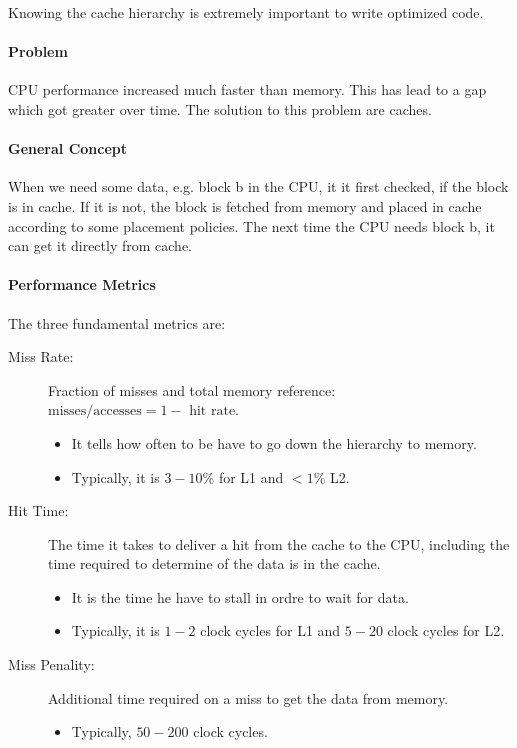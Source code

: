 

Knowing the cache hierarchy is extremely important to write optimized code.

\paragraph{Problem}
CPU performance increased much faster than memory. This has lead to a gap which got greater over time. The solution to this problem are caches.

\paragraph{General Concept}
When we need some data, e.g. block b in the CPU, it it first checked, if the block is in cache. If it is not, the block is fetched from memory and placed in cache according to some placement policies. The next time the CPU needs block b, it can get it directly from cache.

\paragraph{Performance Metrics}
The three fundamental metrics are:

\begin{description}
    \item[Miss Rate:] Fraction of misses and total memory reference: $\text{misses} / \text{accesses} = 1 - \text{ hit rate}$.
        \begin{itemize}
            \item It tells how often to be have to go down the hierarchy to memory.
            \item Typically, it is $3-10$\% for L1 and $< 1$\% L2.
        \end{itemize}
    \item[Hit Time:] The time it takes to deliver a hit from the cache to the CPU, including the time required to determine of the data is in the cache.
        \begin{itemize}
            \item It is the time he have to stall in ordre to wait for data.
            \item Typically, it is $1 - 2$ clock cycles for L1 and $5 - 20$ clock cycles for L2.
        \end{itemize}
    \item[Miss Penality:] Additional time required on a miss to get the data from memory.
        \begin{itemize}
            \item Typically, $50 - 200$ clock cycles.
        \end{itemize}
\end{description}

